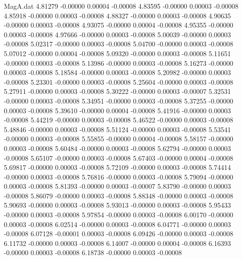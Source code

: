 \begin{filecontents}{MagA.dat}
   4.81279   -0.00000    0.00004   -0.00008
   4.83595   -0.00000    0.00003   -0.00008
   4.85918   -0.00000    0.00003   -0.00008
   4.88327   -0.00000    0.00003   -0.00008
   4.90635   -0.00000    0.00003   -0.00008
   4.93075   -0.00000    0.00004   -0.00008
   4.95355   -0.00000    0.00003   -0.00008
   4.97666   -0.00000    0.00003   -0.00008
   5.00039   -0.00000    0.00003   -0.00008
   5.02317   -0.00000    0.00003   -0.00008
   5.04700   -0.00000    0.00003   -0.00008
   5.07012   -0.00000    0.00004   -0.00008
   5.09320   -0.00000    0.00003   -0.00008
   5.11651   -0.00000    0.00003   -0.00008
   5.13986   -0.00000    0.00003   -0.00008
   5.16273   -0.00000    0.00003   -0.00008
   5.18584   -0.00000    0.00003   -0.00008
   5.20982   -0.00000    0.00003   -0.00008
   5.23301   -0.00000    0.00003   -0.00008
   5.25604   -0.00000    0.00003   -0.00008
   5.27911   -0.00000    0.00003   -0.00008
   5.30222   -0.00000    0.00003   -0.00007
   5.32531   -0.00000    0.00003   -0.00008
   5.34951   -0.00000    0.00003   -0.00008
   5.37255   -0.00000    0.00003   -0.00008
   5.39610   -0.00000    0.00004   -0.00008
   5.41916   -0.00000    0.00003   -0.00008
   5.44219   -0.00000    0.00003   -0.00008
   5.46522   -0.00000    0.00003   -0.00008
   5.48846   -0.00000    0.00003   -0.00008
   5.51124   -0.00000    0.00003   -0.00008
   5.53541   -0.00000    0.00003   -0.00008
   5.55855   -0.00000    0.00004   -0.00008
   5.58157   -0.00000    0.00003   -0.00008
   5.60484   -0.00000    0.00003   -0.00008
   5.62794   -0.00000    0.00003   -0.00008
   5.65107   -0.00000    0.00003   -0.00008
   5.67403   -0.00000    0.00004   -0.00008
   5.69817   -0.00000    0.00003   -0.00008
   5.72109   -0.00000    0.00003   -0.00008
   5.74414   -0.00000    0.00003   -0.00008
   5.76816   -0.00000    0.00003   -0.00008
   5.79094   -0.00000    0.00003   -0.00008
   5.81393   -0.00000    0.00003   -0.00007
   5.83790   -0.00000    0.00003   -0.00008
   5.86079   -0.00000    0.00003   -0.00008
   5.88348   -0.00000    0.00003   -0.00008
   5.90693   -0.00000    0.00003   -0.00008
   5.93013   -0.00000    0.00003   -0.00008
   5.95433   -0.00000    0.00003   -0.00008
   5.97854   -0.00000    0.00003   -0.00008
   6.00170   -0.00000    0.00003   -0.00008
   6.02514   -0.00000    0.00003   -0.00008
   6.04771   -0.00000    0.00003   -0.00008
   6.07128   -0.00001    0.00003   -0.00008
   6.09426   -0.00000    0.00003   -0.00008
   6.11732   -0.00000    0.00003   -0.00008
   6.14007   -0.00000    0.00004   -0.00008
   6.16393   -0.00000    0.00003   -0.00008
   6.18738   -0.00000    0.00003   -0.00008

\end{filecontents}
